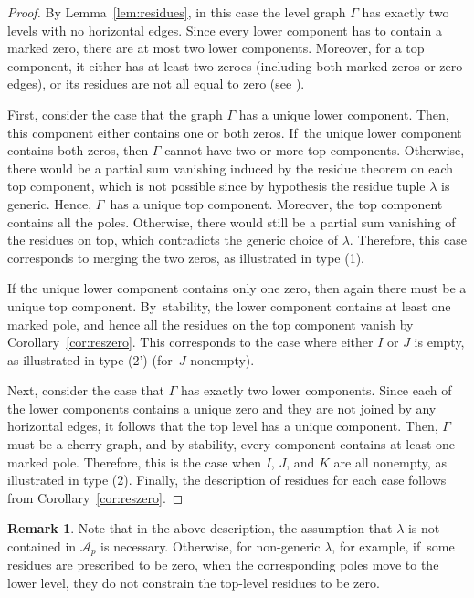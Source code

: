 \documentclass[JEP,XML,SOM,Unicode,NoFloatCountersInSection,published]{cedram}
\theoremstyle{definition}
\newtheorem{rmk}[thm]{Remark}
\begin{document}
\begin{proof}
By Lemma~\ref{lem:residues}, in this case the level graph $\Gamma$ has exactly two levels with no horizontal edges. Since every lower component has to contain a marked zero, there are at most two lower components.
Moreover, for a top component, it either has at least two zeroes (including both marked zeros or zero edges), or its residues are not all equal to zero (see \cite[Th.\,1.2(i)]{getaab}).

First, consider the case that the graph $\Gamma$ has a unique lower component. Then, this component either contains one or both zeros. If~the unique lower component contains both zeros, then $\Gamma$ cannot have two or more top components. Otherwise, there would be a partial sum vanishing induced by the residue theorem on each top component, which is not possible since by hypothesis the residue tuple $\lambda$ is generic. Hence, $\Gamma$~has a unique top component. Moreover, the top component contains all the poles. Otherwise, there would still be a partial sum vanishing of the residues on top, which contradicts the generic choice of $\lambda$. Therefore, this case corresponds to merging the two zeros, as illustrated in type (1).

If the unique lower component contains only one zero, then again there must be a unique top component. By~stability, the lower component contains at least one marked pole, and hence all the residues on the top component vanish by Corollary~\ref{cor:reszero}. This corresponds to the case where either $I$ or $J$ is empty, as illustrated in type (2') (for~$J$ nonempty).

Next, consider the case that $\Gamma$ has exactly two lower components. Since each of the lower components contains a unique zero and they are not joined by any horizontal edges, it follows that the top level has a unique component.
Then, $\Gamma$ must be a cherry graph, and by stability, every component contains at least one marked pole. Therefore, this is the case when $I$, $J$, and $K$ are all nonempty, as illustrated in type (2).
Finally, the description of residues for each case follows from Corollary~\ref{cor:reszero}.
\end{proof}

\begin{rmk}
Note that in the above description, the assumption that $\lambda$ is not contained in $\mathcal{A}_{p}$ is necessary. Otherwise, for non-generic $\lambda$, for example, if~some residues are prescribed to be zero, when the corresponding poles move to the lower level, they do not constrain the top-level residues to be zero.
\end{rmk}
\end{document}
